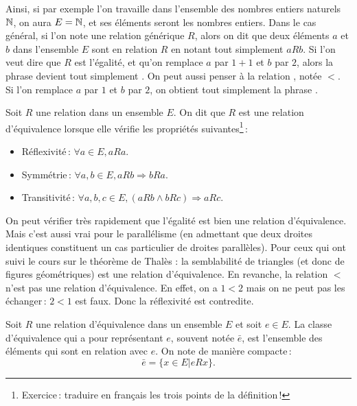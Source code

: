 		Ainsi, si par exemple l'on travaille dans l'ensemble des nombres entiers naturels $\mathbb{N}$, on aura $E=\mathbb{N}$, et ses éléments seront les nombres entiers. Dans le cas général, si l'on note une relation générique $R$, alors on dit que deux éléments $a$ et $b$ dans l'ensemble $E$ sont en relation $R$ en notant tout simplement $aRb$. Si l'on veut dire que $R$ est l'égalité, et qu'on remplace $a$ par $1+1$ et $b$ par $2$, alors la phrase  devient tout simplement . On peut aussi penser à la relation , notée $<$. Si l'on remplace $a$ par $1$ et $b$ par $2$, on obtient tout simplement la phrase .

		\begin{defi}
			Soit $R$ une relation dans un ensemble $E$. On dit que $R$ est une relation d'équivalence lorsque elle vérifie les propriétés suivantes\footnote{Exercice\,: traduire en français les trois points de la définition\,!}\,:
			\begin{itemize}[$\bullet$]
				\item Réflexivité\,: $\forall a\in E, aRa$.
				\item Symmétrie\,: $\forall a,b\in E, aRb\Rightarrow bRa$.
				\item Transitivité\,: $\forall a,b,c\in E, (aRb\wedge bRc)\Rightarrow aRc$. 
			\end{itemize}
		\end{defi}

		On peut vérifier très rapidement que l'égalité est bien une relation d'équivalence. Mais c'est aussi vrai pour le parallélisme (en admettant que deux droites identiques constituent un cas particulier de droites parallèles). Pour ceux qui ont suivi le cours sur le théorème de Thalès : la semblabilité de triangles (et donc de figures géométriques) est une relation d'équivalence. En revanche, la relation $<$ n'est pas une relation d'équivalence. En effet, on a $1<2$ mais on ne peut pas les échanger\,: $2<1$ est faux. Donc la réflexivité est contredite.


		\begin{defi}
			Soit $R$ une relation d'équivalence dans un ensemble $E$ et soit $e\in E$. La classe d'équivalence qui a pour représentant $e$, souvent notée $\bar{e}$, est l'ensemble des éléments qui sont en relation avec $e$. On note de manière compacte\,:
			\begin{equation}
				\bar{e}=\{x\in E | eRx\}.
			\end{equation}
		\end{defi}


